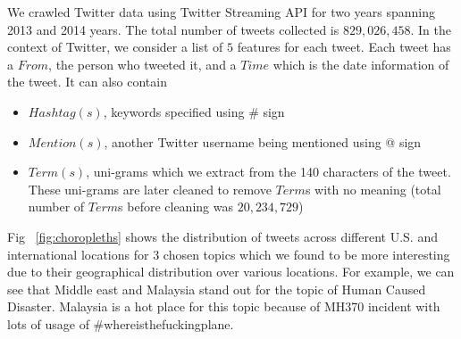 We crawled Twitter data using Twitter Streaming API for two years spanning 2013 and 2014 years. 
The total number of tweets collected is $829,026,458$. In the context of Twitter, we consider a list of $5$ features for each tweet. Each tweet has a $From$, the person who tweeted it, and a $Time$ which is the date information of the tweet. It can also contain 
\begin{itemize}
\item $Hashtag(s)$, keywords specified using \# sign
\item $Mention(s)$, another Twitter username being mentioned using @ sign
\item $Term(s)$, uni-grams which we extract from the 140 characters of the tweet. These uni-grams are later cleaned to remove $Term$s with no meaning (total number of $Term$s before cleaning was $20,234,729$)
\end{itemize}
Fig ~\ref{fig:choropleths} shows the distribution of tweets across different U.S. and international locations for $3$ chosen topics which we found to be more interesting due to their geographical distribution over various locations. For example, we can see that Middle east and Malaysia stand out for the topic of Human Caused Disaster. Malaysia is a hot place for this topic because of MH370 incident with lots of usage of \#whereisthefuckingplane.

